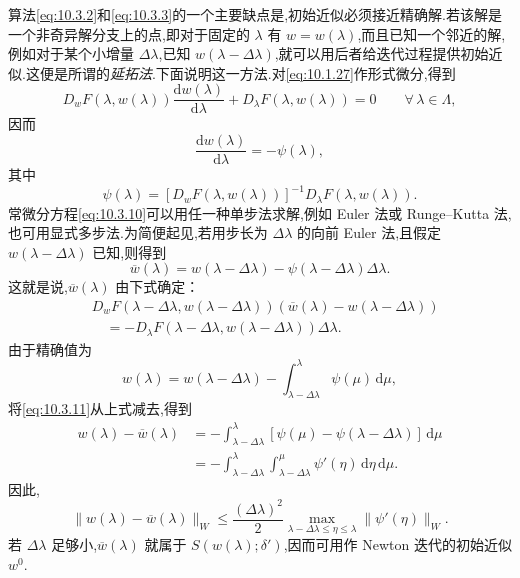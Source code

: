 算法\eqref{eq:10.3.2}和\eqref{eq:10.3.3}的一个主要缺点是,初始近似必须接近精确解.若该解是一个非奇异解分支上的点,即对于固定的 \(\lambda\) 有 \(w=w(\lambda)\),而且已知一个邻近的解,例如对于某个小增量 \(\Delta\lambda\),已知 \(w(\lambda-\Delta\lambda)\),就可以用后者给迭代过程提供初始近似.这便是所谓的\emph{延拓法}.下面说明这一方法.对\eqref{eq:10.1.27}作形式微分,得到
\[
  D_wF(\lambda,w(\lambda))\frac{\mathrm dw(\lambda)}{\mathrm d\lambda}
    +D_\lambda F(\lambda,w(\lambda))=0\qquad\forall\,\lambda\in\Lambda,
\]
因而
\begin{equation}\label{eq:10.3.10}
  \frac{\mathrm dw(\lambda)}{\mathrm d\lambda}=-\psi(\lambda),
\end{equation}
其中
\[
  \psi(\lambda)=[D_wF(\lambda,w(\lambda))]^{-1}D_\lambda F(\lambda,w(\lambda)).
\]
常微分方程\eqref{eq:10.3.10}可以用任一种单步法求解,例如 Euler 法或 Runge--Kutta 法,也可用显式多步法.为简便起见,若用步长为 \(\Delta\lambda\) 的向前 Euler 法,且假定 \(w(\lambda-\Delta\lambda)\) 已知,则得到
\begin{equation}\label{eq:10.3.11}
  \overline w(\lambda)=w(\lambda-\Delta\lambda)-\psi(\lambda-\Delta\lambda)\Delta\lambda.
\end{equation}
这就是说,\(\overline w(\lambda)\) 由下式确定：
\[
  \begin{aligned}
   &D_wF(\lambda-\Delta\lambda,w(\lambda-\Delta\lambda))
            (\overline w(\lambda)-w(\lambda-\Delta\lambda))\\
   &\quad=-D_\lambda F(\lambda-\Delta\lambda,w(\lambda-\Delta\lambda))\Delta\lambda.
  \end{aligned}
\]
由于精确值为
\[
  w(\lambda)=w(\lambda-\Delta\lambda)-\int_{\lambda-\Delta\lambda}^{\lambda}\psi(\mu)\,\mathrm d\mu,
\]
将\eqref{eq:10.3.11}从上式减去,得到
\[
  \begin{aligned}
    w(\lambda)-\overline w(\lambda)
      &=-\int_{\lambda-\Delta\lambda}^{\lambda}
         [\psi(\mu)-\psi(\lambda-\Delta\lambda)]\,\mathrm d\mu\\
      &=-\int_{\lambda-\Delta\lambda}^{\lambda}
          \int_{\lambda-\Delta\lambda}^{\mu}\psi'(\eta)\,\mathrm d\eta\,\mathrm d\mu .
  \end{aligned}
\]
因此,
\[
  \|w(\lambda)-\overline w(\lambda)\|_W
      \le\frac{(\Delta\lambda)^2}{2}
          \max_{\lambda-\Delta\lambda\le\eta\le\lambda}\|\psi'(\eta)\|_W .
\]
若 \(\Delta\lambda\) 足够小,\(\overline w(\lambda)\) 就属于 \(S(w(\lambda);\delta')\),因而可用作 Newton 迭代的初始近似 \(w^0\).

